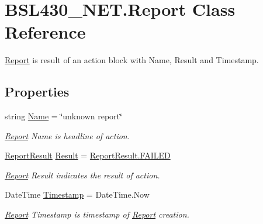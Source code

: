 \hypertarget{class_b_s_l430___n_e_t_1_1_report}{}\section{B\+S\+L430\+\_\+\+N\+E\+T.\+Report Class Reference}
\label{class_b_s_l430___n_e_t_1_1_report}


\mbox{\hyperlink{class_b_s_l430___n_e_t_1_1_report}{Report}} is result of an action block with Name, Result and Timestamp.  


\subsection*{Properties}
\begin{DoxyCompactItemize}
\item 
string \mbox{\hyperlink{class_b_s_l430___n_e_t_1_1_report_aabe691648841f12ec20a2d5899352916}{Name}} = \char`\"{}unknown report\char`\"{}
\begin{DoxyCompactList}\small\item\em \mbox{\hyperlink{class_b_s_l430___n_e_t_1_1_report}{Report}} Name is headline of action. \end{DoxyCompactList}\item 
\mbox{\hyperlink{namespace_b_s_l430___n_e_t_a5329555917cbeec8fdb5a3fe35126138}{Report\+Result}} \mbox{\hyperlink{class_b_s_l430___n_e_t_1_1_report_a44ea71eae01b3d80e083ae753fd6e5b0}{Result}} = \mbox{\hyperlink{namespace_b_s_l430___n_e_t_a5329555917cbeec8fdb5a3fe35126138ab9e14d9b2886bcff408b85aefa780419}{Report\+Result.\+F\+A\+I\+L\+ED}}
\begin{DoxyCompactList}\small\item\em \mbox{\hyperlink{class_b_s_l430___n_e_t_1_1_report}{Report}} Result indicates the result of action. \end{DoxyCompactList}\item 
Date\+Time \mbox{\hyperlink{class_b_s_l430___n_e_t_1_1_report_aa445f580f3680b0260ee3fa30e7f8872}{Timestamp}} = Date\+Time.\+Now
\begin{DoxyCompactList}\small\item\em \mbox{\hyperlink{class_b_s_l430___n_e_t_1_1_report}{Report}} Timestamp is timestamp of \mbox{\hyperlink{class_b_s_l430___n_e_t_1_1_report}{Report}} creation. \end{DoxyCompactList}\end{DoxyCompactItemize}


